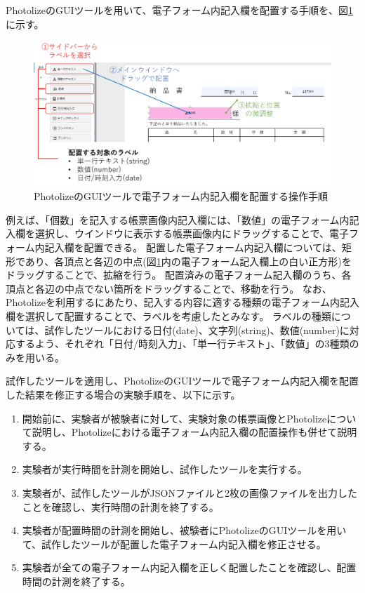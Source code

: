 PhotolizeのGUIツールを用いて、電子フォーム内記入欄を配置する手順を、図\ref{fig:photolize_how_to_use}に示す。
\begin{figure}[tp]
    \begin{center}
        \includegraphics[width=15cm]{image/06-discussion/photolize_how_to_use.jpg}
        \caption{PhotolizeのGUIツールで電子フォーム内記入欄を配置する操作手順}
        \label{fig:photolize_how_to_use}
    \end{center}
\end{figure}
例えば、「個数」を記入する帳票画像内記入欄には、「数値」の電子フォーム内記入欄を選択し、ウインドウに表示する帳票画像内にドラッグすることで、電子フォーム内記入欄を配置できる。
配置した電子フォーム内記入欄については、矩形であり、各頂点と各辺の中点(図\ref{fig:photolize_how_to_use}内の電子フォーム記入欄上の白い正方形)をドラッグすることで、拡縮を行う。
配置済みの電子フォーム記入欄のうち、各頂点と各辺の中点でない箇所をドラッグすることで、移動を行う。
なお、Photolizeを利用するにあたり、記入する内容に適する種類の電子フォーム内記入欄を選択して配置することで、ラベルを考慮したとみなす。
ラベルの種類については、試作したツールにおける日付(date)、文字列(string)、数値(number)に対応するよう、それぞれ「日付/時刻入力」、「単一行テキスト」、「数値」の3種類のみを用いる。

試作したツールを適用し、PhotolizeのGUIツールで電子フォーム内記入欄を配置した結果を修正する場合の実験手順を、以下に示す。

\begin{enumerate}
    \item 開始前に、実験者が被験者に対して、実験対象の帳票画像とPhotolizeについて説明し、Photolizeにおける電子フォーム内記入欄の配置操作も併せて説明する。
    \item 実験者が実行時間を計測を開始し、試作したツールを実行する。
    \item 実験者が、試作したツールがJSONファイルと2枚の画像ファイルを出力したことを確認し、実行時間の計測を終了する。
    \item 実験者が配置時間の計測を開始し、被験者にPhotolizeのGUIツールを用いて、試作したツールが配置した電子フォーム内記入欄を修正させる。
    \item 実験者が全ての電子フォーム内記入欄を正しく配置したことを確認し、配置時間の計測を終了する。
\end{enumerate}

